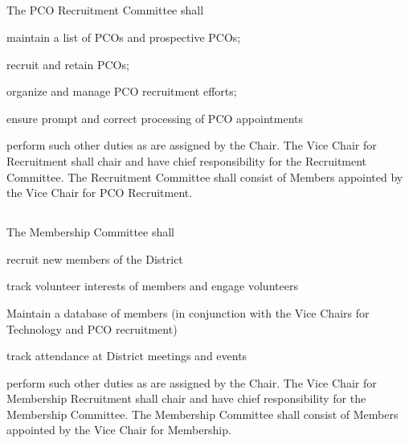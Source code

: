 \subsection{} \label{pco-recruitment-committee}
The PCO Recruitment Committee shall
\begin{inlinealphalist}
    \item maintain a list of PCOs and prospective PCOs;
    \item recruit and retain PCOs;
    \item organize and manage PCO recruitment efforts;
    \item ensure prompt and correct processing of PCO appointments
    \item perform such other duties as are assigned by the Chair. The Vice Chair for Recruitment shall chair and have chief responsibility for the Recruitment Committee.  The Recruitment Committee shall consist of Members appointed by the Vice Chair for PCO Recruitment.
\end{inlinealphalist}

\subsection{} \label{membership-committee}
The Membership Committee shall
\begin{inlinealphalist}
    \item recruit new members of the District
    \item track volunteer interests of members and engage volunteers
    \item Maintain a database of members (in conjunction with the Vice Chairs for Technology and PCO recruitment)
    \item track attendance at District meetings and events
    \item perform such other duties as are assigned by the Chair. The Vice Chair for Membership Recruitment shall chair and have chief responsibility for the Membership Committee. The Membership Committee shall consist of Members appointed by the Vice Chair for Membership.
\end{inlinealphalist}


